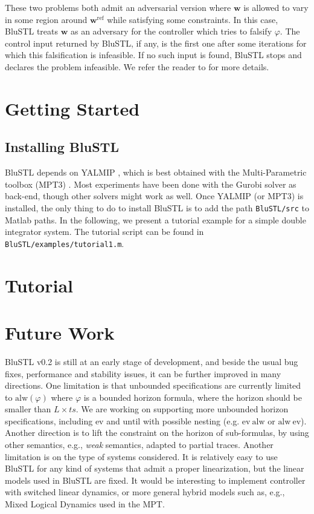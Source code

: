 \documentclass[hyperref, xcolor=dvipsnames, 10pt]{article} %
\def \w {\mathbf{w}}
\def \f {\varphi}
\def\wr {\w^{\text{ref}}}
\def\G {\text{alw}}
\def\F {\text{ev}}
\def\until {\text{until}}
\begin{document}
These two problems both admit an adversarial version where $\w$ is allowed to vary in some region
around $\wr$ while satisfying some constraints. In this case, BluSTL treats $\w$ as an adversary
for the controller which tries to falsify $\f$. The control input returned by BluSTL, if any, is the
first one after some iterations for which this falsification is infeasible. If no such input is
found, BluSTL stops and declares the problem infeasible. We refer the reader to \cite{HSCC15} for more
details. 

%
\section{Getting Started}
%
\subsection{Installing BluSTL}
BluSTL depends on YALMIP \cite{YALMIP}, which is best obtained with the Multi-Parametric toolbox
(MPT3) \cite{MPT3}. Most experiments have been done with the Gurobi solver \cite{gurobi} as
back-end, though other solvers might work as well. Once YALMIP (or MPT3) is installed, the only thing to do to
install BluSTL is to add the path \verb+BluSTL/src+ to Matlab paths. In the following, we present a
tutorial example for a simple double integrator system. The tutorial script can be found in \verb+BluSTL/examples/tutorial1.m+.

%
\section{Tutorial}
% 




%
\section{Future Work}
%
BluSTL v0.2 is still at an early stage of development, and beside the usual bug fixes,
performance and stability issues, it can be further improved in many directions. One limitation is
that unbounded specifications are currently limited to $\G (\f)$ where $\f$ is a bounded horizon
formula, where the horizon should be smaller than $L\times ts$. We are working on supporting more
unbounded horizon specifications, including $\F$ and $\until$ with possible nesting (e.g. $\F\ \G$
or $\G\ \F$). Another direction is to lift the constraint on the horizon of sub-formulas, by using
other semantics, e.g., \emph{weak} semantics, adapted to partial traces. Another limitation is on
the type of systems considered. It is relatively easy to use BluSTL for any kind of systems that
admit a proper linearization, but the linear models used in BluSTL are fixed. It would be
interesting to implement controller with switched linear dynamics, or more general hybrid models
such as, e.g., Mixed Logical Dynamics used in the MPT.  






%
\end{document}
